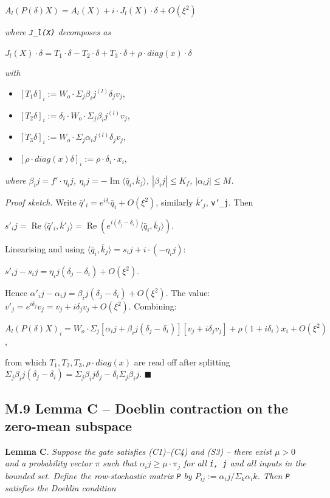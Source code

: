 \documentclass[11pt,a4paper]{article}
\theoremstyle{plain}
\theoremstyle{definition}
\renewcommand{\Re}{\operatorname{Re}}
\renewcommand{\Im}{\operatorname{Im}}
\begin{document}
$A_l(P(\delta )X) = A_l(X) + i \cdot  J_l(X) \cdot  \delta  + O(\xi ^2)$

\emph{where \texttt{J\_l(X)} decomposes as}

$J_l(X)\cdot \delta  = T_1 \cdot  \delta  - T_2 \cdot  \delta  + T_3 \cdot  \delta  + \rho  \cdot  diag(x) \cdot  \delta $

\emph{with}

\begin{itemize}
  \item $[T_1 \delta ]_i := W_o \cdot  \Sigma _j \beta _ij^{(l)} \delta _j v_j$,
  \item $[T_2 \delta ]_i := \delta _i \cdot  W_o \cdot  \Sigma _j \beta _ij^{(l)} v_j$,
  \item $[T_3 \delta ]_i := W_o \cdot  \Sigma _j \alpha _ij^{(l)} \delta _j v_j$,
  \item $[\rho  \cdot  diag(x) \delta ]_i := \rho  \cdot  \delta _i \cdot  x_i$,
\end{itemize}

\emph{where $\beta _ij = f' \cdot  \eta _ij$, $\eta _ij = -\Im \langle \bar{q}_i, \bar{k}_j\rangle $, $|\beta _ij| \le  K_f$, $|\alpha _ij| \le  M$.}

\emph{Proof sketch.} Write $\bar{q}'_i = e^{i\delta _i} \bar{q}_i + O(\xi ^2)$, similarly $\bar{k}'_j$, \texttt{v'\_j}. Then

$s'_ij = \Re \langle \bar{q}'_i, \bar{k}'_j\rangle  = \Re (e^{i(\delta _j - \delta _i)} \langle \bar{q}_i, \bar{k}_j\rangle )$.

Linearising and using $\langle \bar{q}_i, \bar{k}_j\rangle  = s_ij + i \cdot  (-\eta _ij)$:

$s'_ij - s_ij = \eta _ij (\delta _j - \delta _i) + O(\xi ^2)$.

Hence $\alpha '_ij - \alpha _ij = \beta _ij (\delta _j - \delta _i) + O(\xi ^2)$. The value: $v'_j = e^{i\delta _j} v_j = v_j + i \delta _j v_j + O(\xi ^2)$. Combining:

$A_l(P(\delta )X)_i = W_o \cdot  \Sigma _j [\alpha _ij + \beta _ij(\delta _j - \delta _i)][v_j + i \delta _j v_j] + \rho (1 + i \delta _i) x_i + O(\xi ^2)$,

from which $T_1, T_2, T_3, \rho  \cdot  diag(x)$ are read off after splitting $\Sigma _j \beta _ij(\delta _j - \delta _i) = \Sigma _j \beta _ij \delta _j - \delta _i \Sigma _j \beta _ij$. $\blacksquare$

\subsection{M.9 Lemma C -- Doeblin contraction on the zero-mean subspace}
\textbf{Lemma C}. \emph{Suppose the gate satisfies (C1)--(C4) and (S3) -- there exist $\mu  > 0$ and a probability vector $\pi $ such that $\alpha _ij \ge  \mu  \cdot  \pi _j$ for all \texttt{i, j} and all inputs in the bounded set. Define the row-stochastic matrix \texttt{P} by $P_{ij} := \alpha _ij / \Sigma _k \alpha _ik$. Then \texttt{P} satisfies the Doeblin condition}
\end{document}
